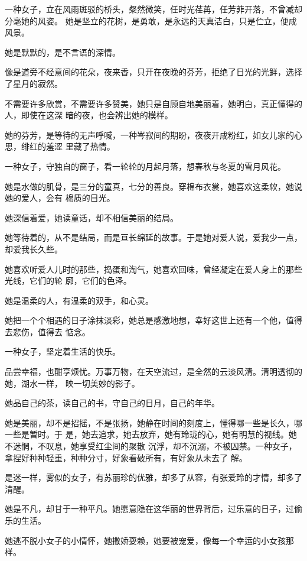 \documentclass[12pt,a4paper]{article}
\begin{document}
	\endwriting



		一种女子，立在风雨斑驳的桥头，粲然微笑，任时光荏苒，任芳菲开落，不曾减却分毫她的风姿。
	她是坚立的花树，是勇敢，是永远的天真洁白，只是伫立，便成风景。


		她是默默的，是不言语的深情。

		像是道旁不经意间的花朵，夜来香，只开在夜晚的芬芳，拒绝了日光的光鲜，选择了星月的寂然。

		不需要许多欣赏，不需要许多赞美，她只是自顾自地美丽着，她明白，真正懂得的人，即使在这深
	暗的夜，也会辨出她的模样。

		她的芬芳，是等待的无声呼喊，一种岑寂间的期盼，夜夜开成粉红，如女儿家的心思，绯红的羞涩
	里藏了热情。

		一种女子，守独自的窗子，看一轮轮的月起月落，想春秋与冬夏的雪月风花。

		她是水做的肌骨，是三分的童真，七分的善良。穿棉布衣裳，她喜欢这柔软，她说她的爱人，会有
	棉质的目光。


		她深信着爱，她读童话，却不相信美丽的结局。

		她等待着的，从不是结局，而是亘长绵延的故事。于是她对爱人说，爱我少一点，却爱我长久些。

		她喜欢听爱人儿时的那些，捣蛋和淘气，她喜欢回味，曾经凝定在爱人身上的那些光线，它们的轮
	廓，它们的色泽。

		她是温柔的人，有温柔的双手，和心灵。

		她把一个个相遇的日子涂抹淡彩，她总是感激地想，幸好这世上还有一个他，值得去悲伤，值得去
	惦念。


		一种女子，坚定着生活的快乐。

		品尝幸福，也酣享烦忧。万事万物，在天空流过，是全然的云淡风清。清明透彻的她，湖水一样，
	映一切美妙的影子。

		她品自己的茶，读自己的书，守自己的日月，自己的年华。

		她是美丽，却不是招摇，不是张扬，她静在时间的刻度上，懂得哪一些是长久，哪一些是暂时。于
	是，她去追求，她去放弃，她有玲珑的心，她有明慧的视线。她不迷惘，不叹息，她享受红尘间的聚散
	沉浮，却不沉溺，不被囚禁。一种女子，拿捏好种种轻重，种种分寸，好象看破所有，有好象从未去了
	解。

		是迷一样，雾似的女子，有苏丽珍的优雅，却多了从容，有张爱玲的才情，却多了清醒。


		她是不凡，却甘于一种平凡。她愿意隐在这华丽的世界背后，过乐意的日子，过偷乐的生活。

		她逃不脱小女子的小情怀，她撒娇耍赖，她要被宠爱，像每一个幸运的小女孩那样。
\end{document}
